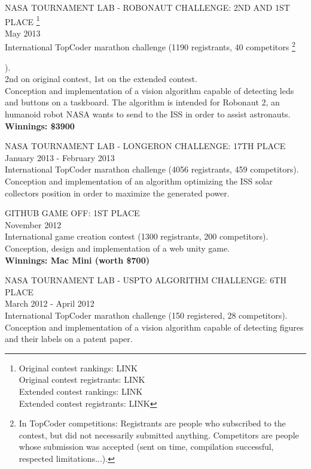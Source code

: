 \documentclass[11pt]{res} %
\newcommand{\footnoteremember}[2]{
\footnote{#2}
\newcounter{#1}
\setcounter{#1}{\value{footnote}}
}
\newcommand{\footnoterecall}[1]{
\footnotemark[\value{#1}]
}
\begin{document}
\begin{resume}
NASA TOURNAMENT LAB - ROBONAUT CHALLENGE: 2ND AND 1ST PLACE\footnoteremember{robonaut_rankings}{Original contest rankings: LINK \\
Original contest registrants: LINK \\
Extended contest rankings: LINK \\
Extended contest registrants: LINK} \\
May 2013 \\
International TopCoder marathon challenge (1190 registrants, 40 competitors\footnoteremember{topcoder_comp_reg}{In TopCoder competitions: Registrants are people who subscribed to the contest, but did not necessarily submitted anything. Competitors are people whose submission was accepted (sent on time, compilation successful, respected limitations...).}\footnoterecall{robonaut_rankings}). \\
2nd on original contest, 1st on the extended contest. \\
Conception and implementation of a vision algorithm capable of detecting leds and buttons on a taskboard.
The algorithm is intended for Robonaut 2, an humanoid robot NASA wants to send to the ISS in order to assist
astronauts. \\
{\bf Winnings: \$3900}

NASA TOURNAMENT LAB - LONGERON CHALLENGE: 17TH PLACE \\
January 2013 - February 2013 \\
International TopCoder marathon challenge (4056 registrants, 459 competitors). \\
Conception and implementation of an algorithm optimizing the ISS solar collectors position in order to
maximize the generated power.

GITHUB GAME OFF: 1ST PLACE \\
November 2012 \\
International game creation contest (1300 registrants, 200 competitors). \\
Conception, design and implementation of a web unity game. \\
{\bf Winnings: Mac Mini (worth \$700)}

NASA TOURNAMENT LAB - USPTO ALGORITHM CHALLENGE: 6TH PLACE \\
March 2012 - April 2012 \\
International TopCoder marathon challenge (150 registered, 28 competitors). \\
Conception and implementation of a vision algorithm capable of detecting figures and their labels on a patent paper.


\end{resume}
\end{document}
